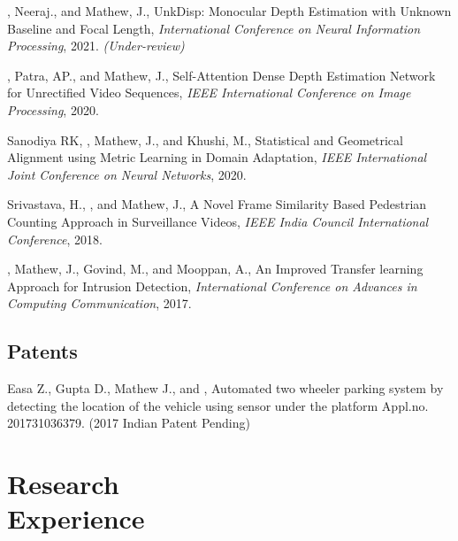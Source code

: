 \documentclass[mm]{simple_style}
\begin{document}
\begin{resume}
, Neeraj., and Mathew, J., UnkDisp: Monocular Depth Estimation with
Unknown Baseline and Focal Length, \textit{International Conference on Neural Information Processing}, 2021. \textit{(Under-review)}

, Patra, AP., and Mathew, J., Self-Attention Dense Depth Estimation Network for Unrectified Video Sequences, \textit{IEEE International Conference on Image Processing}, 2020.

Sanodiya RK, , Mathew, J., and Khushi, M., Statistical and Geometrical Alignment using Metric Learning in Domain Adaptation, \textit{IEEE International Joint Conference on Neural Networks}, 2020.

Srivastava, H., , and Mathew, J., A Novel Frame Similarity Based Pedestrian Counting Approach in Surveillance Videos, \textit{IEEE India Council International Conference}, 2018.

, Mathew, J., Govind, M., and Mooppan, A., An Improved Transfer learning Approach for Intrusion Detection, \textit{International Conference on Advances in Computing  Communication}, 2017.\\
\halfsectionline
\vspace{-12mm}
\subsection{Patents}
\vspace{-2ex}

Easa Z., Gupta D., Mathew J., and , Automated two wheeler parking system by detecting the location of the vehicle using sensor under the platform Appl.no. 201731036379. (2017 Indian Patent Pending)

\vspace{-2ex}
\sectionline


\section{Research\\Experience}


\end{resume}
\end{document}
